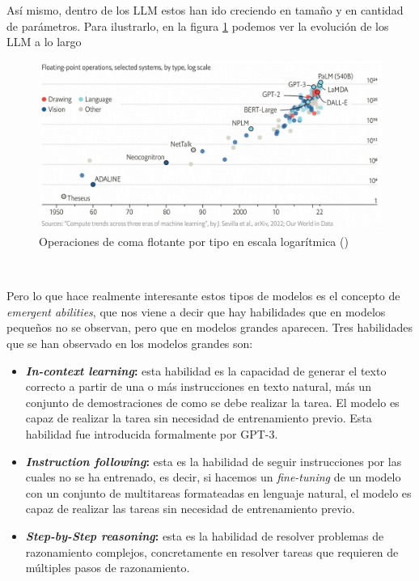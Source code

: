 Así mismo, dentro de los LLM estos han ido creciendo en tamaño y en cantidad de parámetros.
Para ilustrarlo, en la figura \ref{fig:evolutionLLM} podemos ver la evolución de los LLM a lo largo

\begin{figure}[H]
    \begin{center}
      \includegraphics[width=15cm]{figuras/Capitulo_03/EvolutionLLM.png}
    \end{center}
    \caption[Operaciones de coma flotante por tipo en escala logarítmica]{Operaciones de coma flotante por tipo en escala logarítmica (\cite{EvolutionLLM})}
    \label{fig:evolutionLLM}
\end{figure}\

Pero lo que hace realmente interesante estos tipos de modelos es el concepto de
\textit{emergent abilities}, que nos viene a decir que hay habilidades que en
modelos pequeños no se observan, pero que en modelos grandes aparecen. Tres
habilidades que se han observado en los modelos grandes son:

\begin{itemize}
    \item \textbf{\textit{In-context learning}:} esta habilidad es la capacidad
        de generar el texto correcto a partir de una o más instrucciones en texto
        natural, más un conjunto de demostraciones de como se debe realizar la tarea.
        El modelo es capaz de realizar la tarea sin necesidad de entrenamiento previo.
        Esta habilidad fue introducida formalmente por GPT-3.
    \item \textbf{\textit{Instruction following}:} esta es la habilidad de seguir
        instrucciones por las cuales no se ha entrenado, es decir, si hacemos un
        \textit{fine-tuning} de un modelo con un conjunto de multitareas formateadas en
        lenguaje natural, el modelo es capaz de realizar las tareas sin necesidad de
        entrenamiento previo.
    \item \textbf{\textit{Step-by-Step reasoning}:} esta es la habilidad de resolver
        problemas de razonamiento complejos, concretamente en resolver tareas que
        requieren de múltiples pasos de razonamiento.
\end{itemize}

